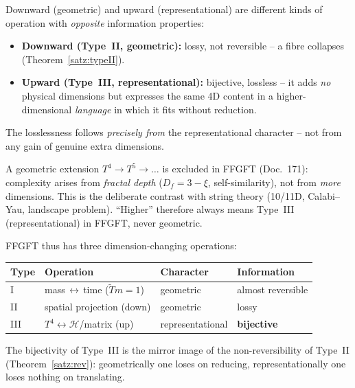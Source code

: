 \begin{important}
Downward (geometric) and upward (representational) are different kinds of
operation with \emph{opposite} information properties:
\begin{itemize}
  \item \textbf{Downward (Type~II, geometric):} lossy, not reversible -- a fibre
  collapses (Theorem~\ref{satz:typeII}).
  \item \textbf{Upward (Type~III, representational):} bijective, lossless -- it
  adds \emph{no} physical dimensions but expresses the same 4D content in a
  higher-dimensional \emph{language} in which it fits without reduction.
\end{itemize}
The losslessness follows \emph{precisely from} the representational character --
not from any gain of genuine extra dimensions.
\end{important}

\begin{remark}
A geometric extension $T^4 \to T^5 \to \dots$ is excluded in FFGFT (Doc.~171):
complexity arises from \emph{fractal depth} ($D_f = 3-\xi$, self-similarity), not
from \emph{more} dimensions. This is the deliberate contrast with string theory
(10/11D, Calabi--Yau, landscape problem). ``Higher'' therefore always means
Type~III (representational) in FFGFT, never geometric.
\end{remark}

FFGFT thus has three dimension-changing operations:

\begin{center}
\begin{tabular}{llll}
\hline
\textbf{Type} & \textbf{Operation} & \textbf{Character} & \textbf{Information} \\
\hline
I & mass\,$\leftrightarrow$\,time ($\tilde T m=1$) & geometric & almost reversible \\
II & spatial projection (down) & geometric & lossy \\
III & $T^4\leftrightarrow\mathcal{H}$/matrix (up) & representational & \textbf{bijective} \\
\hline
\end{tabular}
\end{center}

\noindent
The bijectivity of Type~III is the mirror image of the non-reversibility of
Type~II (Theorem~\ref{satz:rev}): geometrically one loses on reducing,
representationally one loses nothing on translating.

